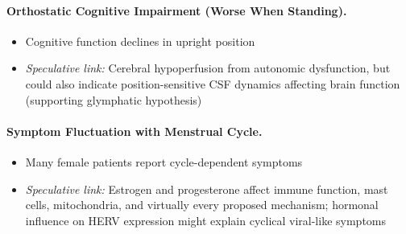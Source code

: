 \paragraph{Orthostatic Cognitive Impairment (Worse When Standing).}
\begin{itemize}
    \item Cognitive function declines in upright position
    \item \textit{Speculative link:} Cerebral hypoperfusion from autonomic dysfunction, but could also indicate position-sensitive CSF dynamics affecting brain function (supporting glymphatic hypothesis)
\end{itemize}

\paragraph{Symptom Fluctuation with Menstrual Cycle.}
\begin{itemize}
    \item Many female patients report cycle-dependent symptoms
    \item \textit{Speculative link:} Estrogen and progesterone affect immune function, mast cells, mitochondria, and virtually every proposed mechanism; hormonal influence on HERV expression might explain cyclical viral-like symptoms
\end{itemize}

